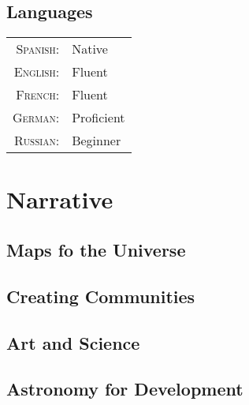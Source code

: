 \documentclass[a4paper,10pt]{article} %
\begin{document}


\subsection{Languages}

\begin{tabular}{rl}
\textsc{Spanish:} & Native\\
\textsc{English:} & Fluent\\
\textsc{French:} & Fluent \\
\textsc{German:} & Proficient \\
\textsc{Russian:} & Beginner \\
\end{tabular}

\color{red}
\section{Narrative}
\color{black}

\subsection{Maps fo the Universe}

\subsection{Creating Communities}

\subsection{Art and Science}

\subsection{Astronomy for Development}
\end{document}
